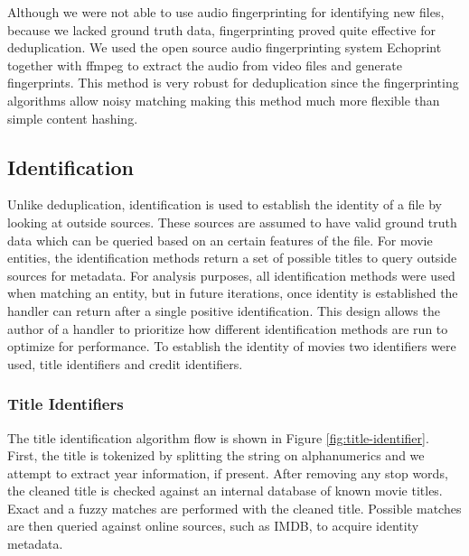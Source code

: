 \documentclass[paper=a4, fontsize=11pt]{scrartcl} %
\numberwithin{equation}{section} %
\numberwithin{figure}{section} %
\numberwithin{table}{section} %
\begin{document}
Although we were not able to use audio fingerprinting for identifying new files, because we lacked ground truth data, fingerprinting proved quite effective for deduplication. We used the open source audio fingerprinting system Echoprint together with ffmpeg to extract the audio from video files and generate fingerprints. This method is very robust for deduplication since the fingerprinting algorithms allow noisy matching making this method much more flexible than simple content hashing. \\



\subsection{Identification}
\label{sec:identification}
Unlike deduplication, identification is used to establish the identity of a file by looking at outside sources. These sources are assumed to have valid ground truth data which can be queried based on an certain features of the file. For movie entities, the identification methods return a set of possible titles to query outside sources for metadata. For analysis purposes, all identification methods were used when matching an entity, but in future iterations, once identity is established the handler can return after a single positive identification. This design allows the author of a handler to prioritize how different identification methods are run to optimize for performance. To establish the identity of movies two identifiers were used, title identifiers and credit identifiers. \\

\subsubsection{Title Identifiers}
\label{sec:title-identifier}

The title identification algorithm flow is shown in Figure \ref{fig:title-identifier}. First, the title is tokenized by splitting the string on alphanumerics and we attempt to extract year information, if present. After removing any stop words, the cleaned title is checked against an internal database of known movie titles. Exact and a fuzzy matches are performed with the cleaned title. Possible matches are then queried against online sources, such as IMDB, to acquire identity metadata. \\
\end{document}
